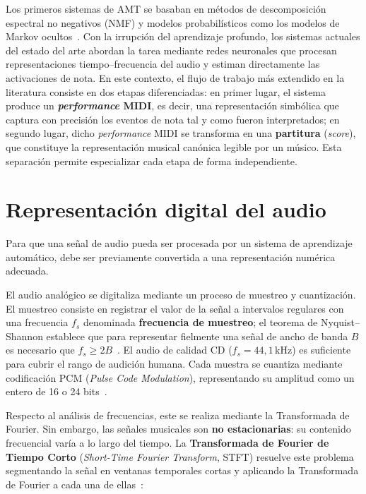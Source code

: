 \documentclass[11pt,spanish,listoffigures,listoftables]{tfgetsinf}
\begin{document}
Los primeros sistemas de AMT se basaban en métodos de
descomposición espectral no negativos (NMF) y modelos probabilísticos como
los modelos de Markov ocultos~\cite{benetos2019amt}. Con la irrupción del
aprendizaje profundo, los sistemas actuales del estado del arte abordan la
tarea mediante redes neuronales que procesan representaciones
tiempo--frecuencia del audio y estiman directamente las activaciones de nota.
En este contexto, el flujo de trabajo más extendido en la literatura consiste
en dos etapas diferenciadas: en primer lugar, el sistema produce un
\textbf{\textit{performance} MIDI}, es decir, una representación simbólica que captura
con precisión los eventos de nota tal y como fueron interpretados; en segundo
lugar, dicho \textit{performance} MIDI se transforma en una \textbf{partitura}
(\textit{score}), que constituye la representación musical canónica legible por
un músico. Esta separación permite especializar cada etapa de forma
independiente.

\section{Representación digital del audio}
\label{secpreliminaresaudio}

Para que una señal de audio pueda ser procesada por un sistema de aprendizaje
automático, debe ser previamente convertida a una representación numérica
adecuada.

El audio analógico se digitaliza mediante un proceso de muestreo y cuantización.
El muestreo consiste en registrar el valor de la señal a intervalos regulares
con una frecuencia $f_s$ denominada \textbf{frecuencia de muestreo}; el teorema
de Nyquist--Shannon establece que para representar fielmente una señal de
ancho de banda $B$ es necesario que $f_s \geq 2B$~\cite{oppenheim2010dsp}. El
audio de calidad CD ($f_s = 44{,}1\,\text{kHz}$) es suficiente para cubrir el
rango de audición humana. Cada muestra se cuantiza mediante codificación PCM
(\textit{Pulse Code Modulation}), representando su amplitud como un entero de
16 o 24 bits~\cite{oppenheim2010dsp}.

Respecto al análisis de frecuencias, este se realiza mediante la
Transformada de Fourier. Sin embargo, las señales musicales son
\textbf{no estacionarias}: su contenido frecuencial varía a lo largo del
tiempo. La \textbf{Transformada de Fourier de Tiempo Corto} (\textit{Short-Time
Fourier Transform}, STFT) resuelve este problema segmentando la señal en
ventanas temporales cortas y aplicando la Transformada de Fourier a cada una
de ellas~\cite{oppenheim2010dsp}:
\end{document}
